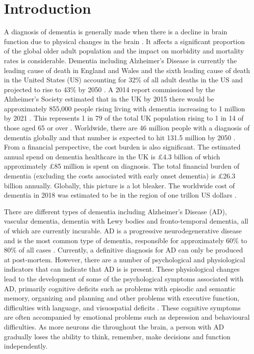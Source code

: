 \documentclass[12pt]{article}
\begin{document}
\section{Introduction}\label{introduction}
A diagnosis of dementia is generally made when there is a decline in brain function due to physical changes in the brain \cite{Albert2011}. It affects a significant proportion of the global older adult population and the impact on morbidity and mortality rates is considerable. Dementia including Alzheimer's Disease is currently the leading cause of death in England and Wales \cite{Patel2018} and the sixth leading cause of death in the United States (US) accounting for 32\% of all adult deaths in the US and projected to rise to 43\% by 2050 \cite{Weuve2014} . A 2014 report commissioned by the Alzheimer's Society estimated that in the UK by 2015 there would be approximately 855,000 people rising living with dementia increasing to 1 million by 2021 \cite{AlzheimersSociety2014}. This represents 1 in 79 of the total UK population rising to 1 in 14 of those aged 65 or over \cite{AlzheimersSociety2014}. Worldwide, there are 46 million people with a diagnosis of dementia globally and that number is expected to hit 131.5 million by 2050 \cite{Prince2015}. From a financial perspective, the cost burden is also significant. The estimated annual spend on dementia healthcare in the UK is £4.3 billion of which approximately £85 million is spent on diagnosis. The total financial burden of dementia (excluding the costs associated with early onset dementia) is £26.3 billion annually. Globally, this picture is a lot bleaker. The worldwide cost of dementia in 2018 was estimated to be in the region of one trillon US dollars \cite{Prince2015}.
\par 
There are different types of dementia including Alzheimer's Disease (AD), vascular dementia, dementia with Lewy bodies and fronto-temporal dementia, all of which are currently incurable. AD is a progressive neurodegenerative disease and is the most common type of dementia, responsible for approximately 60\% to 80\% of all cases \cite{Duong2017}. Currently, a definitive diagnosis for AD can only be produced at post-mortem. However, there are a number of psychological and physiological indicators that can indicate that AD is is present. These physiological changes lead to the development of some of the psychological symptoms associated with AD, primarily cognitive deficits such as problems with episodic and semantic memory, organizing and planning and other problems with executive function, difficulties with language, and visuospatial deficits \cite{McKhann2011}. These cognitive symptoms are often accompanied by emotional problems such as depression and behavioural difficulties. As more neurons die throughout the brain, a person with AD gradually loses the ability to think, remember, make decisions and function independently.
\end{document}
